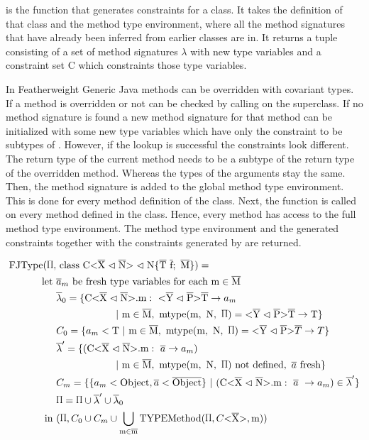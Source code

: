  is the function that generates constraints for a class. It takes the definition of that class and the method type environment, where all the method signatures that have already been inferred from earlier classes are in.
It returns a tuple consisting of a set of method signatures $\lambda$ with new type variables and a constraint set C which constraints those type variables.

In Featherweight Generic Java methods can be overridden with covariant types. If a method is overridden or not can be checked by calling  on the superclass.
If no method signature is found a new method signature for that method can be initialized with some new type variables which have only the constraint to be subtypes of .
However, if the  lookup is successful the constraints look different. The return type of the current method needs to be a subtype of the return type of the overridden method.
Whereas the types of the arguments stay the same. Then, the method signature is added to the global method type environment.
This is done for every method definition of the class. Next, the  function is called on every method defined in the class. Hence, every method has access to the full method type environment.
The method type environment and the generated constraints together with the constraints generated by  are returned.

\begin{align*}
    \text{FJType}(\sprod{0.7}, & \ \classheader \{ \ot{T} \ \ot{f}; \ \ot{M} \}) = \\
    \text{let} \ & \overline{a}_m \ \text{be fresh type variables for each m} \in \ot{M} \\
    & \overline{\lambda}_0 = \{\cm : \ \yp \ot{T} \to a_m \\
    & \quad \quad \quad \quad \quad \quad | \ \text{m} \in \ot{M}, \ \mtype = \yp \ot{T} \to \text{T} \}\\
    & C_0 = \{ a_m < \text{T} \ | \ \text{m} \in \ot{M}, \ \mtype = \yp \oto{T} \}\\
    & \overline{\lambda}' = \{ ( \cm : \ \overline{a} \to a_m ) \\
    & \quad \quad \quad \quad \quad \quad | \ \text{m} \in \ot{M}, \ \mtype \ \text{not defined}, \ \fresh{\overline{a}} \}\\
    & C_m = \{\{ a_m < \text{Object}, \overline{a} < \ot{Object} \} \ | \ ( \cm : \ \overline{a} \ \to a_m) \in \overline{\lambda}' \} \\
    & \sprod{0.7} = \sprod{0.7} \cup \overline{\lambda}' \cup \overline{\lambda}_0\\
\text{in} \ &(\sprod{0.7}, C_0 \cup C_m \cup \bigcup_{ \text{m} \in \ot{m} } \text{TYPEMethod}(\sprod{0.7}, C \vv{\ot{X}}, \text{m}))\\
\end{align*}


